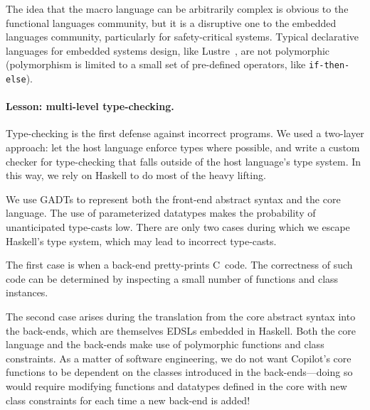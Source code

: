 \documentclass[9pt]{sigplanconf}
\begin{document}
The idea that the macro language can be arbitrarily complex is obvious to the
functional languages community, but it is a disruptive one to the embedded
languages community, particularly for safety-critical systems.  Typical
declarative languages for embedded systems design, like
Lustre~\cite{CaspiPHP87}, are not polymorphic (polymorphism is limited to a
small set of pre-defined operators, like {\tt if-then-else}).

\paragraph{Lesson: multi-level type-checking.}

Type-checking is the first defense against incorrect programs.  We used a
two-layer approach: let the host language enforce types where possible, and
write a custom checker for type-checking that falls outside of the host
language's type system.  In this way, we rely on Haskell to do most of the heavy
lifting.

We use GADTs to represent both the front-end abstract syntax and the core
language.  The use of parameterized datatypes makes the probability of
unanticipated type-casts low.  There are only two cases during which we escape
Haskell's type system, which may lead to incorrect type-casts.  

The first case is when a back-end pretty-prints C~code.  The correctness of such
code can be determined by inspecting a small number of functions and class
instances.

The second case arises during the translation from the core abstract syntax into
the back-ends, which are themselves EDSLs embedded in Haskell.  Both the core
language and the back-ends make use of polymorphic functions and class
constraints.  As a matter of software engineering, we do not want Copilot's core
functions to be dependent on the classes introduced in the back-ends---doing so
would require modifying functions and datatypes defined in the core with new
class constraints for each time a new back-end is added!
\end{document}

